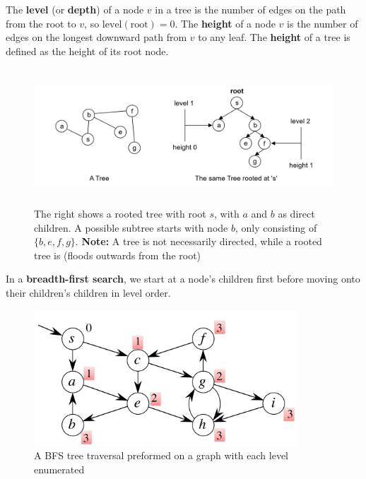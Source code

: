 \begin{Def}

  The \textbf{level} (or \textbf{depth}) of a node $v$ in a tree is the number of edges on the path from the root to $v$, so $\mathrm{level}(\text{root})=0$.  
  The \textbf{height} of a node $v$ is the number of edges on the longest downward path from $v$ to any leaf.  
  The \textbf{height} of a tree is defined as the height of its root node.
\end{Def}

\begin{figure}[h]
    \begin{center}
      \includegraphics[height=2in]{./Sections/graphs/rooted_tree.png}
    \end{center}
     \caption{The right shows a rooted tree with root $s$, with $a$ and $b$ as direct children. A possible
     subtree starts with node $b$, only consisting of $\{b, e,f,g\}$. \textbf{Note:} A tree is 
     not necessarily directed, while a rooted tree is (floods outwards from the root)}\label{fig:rooted_tree}
  \end{figure}



\newpage
\begin{Def}

    In a \textbf{breadth-first search}, we start at a node's children first before moving onto their children's children in level order.
\end{Def}
\begin{figure}[h]
    \begin{center}
      \includegraphics[height=2in]{./Sections/graphs/bfs.png}
    \end{center}
     \caption{A BFS tree traversal preformed on a graph with each level enumerated}\label{fig:bfs}
  \end{figure}

